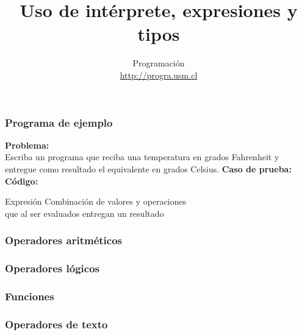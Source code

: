 \documentclass[12pt]{beamer}
\title{Uso de intérprete, expresiones y tipos}
\author{
  Programación \\ \url{http://progra.usm.cl}
}
\date{}
\begin{document}
  \begin{frame}
    \maketitle
  \end{frame}

  \begin{frame}
    \frametitle{Programa de ejemplo}
    \label{prog-ejemplo}

    \textbf{Problema:}\\
    Escriba un programa que reciba una temperatura en grados Fahrenheit
    y entregue como resultado el equivalente en grados Celsius.
    \vfill
    \textbf{Caso de prueba:}\\
    
    \vfill
    \textbf{Código:}\\
    
  \end{frame}

  \begin{frame}
    \label{expresion}
    \begin{block}{Expresión}
      Combinación de valores y operaciones \\
      que al ser evaluados entregan un resultado
    \end{block}
    
  \end{frame}

  \begin{frame}
    \frametitle{Operadores aritméticos}
    \label{operadores-aritmeticos}
    
  \end{frame}

  \begin{frame}
    \frametitle{Operadores lógicos}
    \label{operadores-logicos}
    
  \end{frame}

  \begin{frame}
    \frametitle{Funciones}
    \label{funciones}
    
  \end{frame}

  \begin{frame}
    \frametitle{Operadores de texto}
    \label{operadores-texto}
    
  \end{frame}
\end{document}
